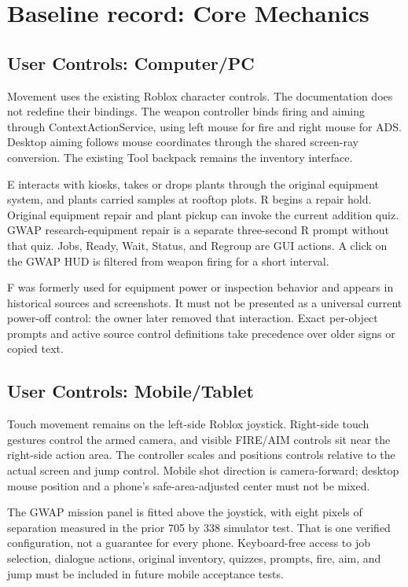 \chapter{Baseline record: Core Mechanics}
\section{User Controls: Computer/\allowbreak{}PC}
Movement uses the existing Roblox character controls.\allowbreak{} The documentation does not redefine their bindings.\allowbreak{} The weapon controller binds firing and aiming through ContextActionService, using left mouse for fire and right mouse for ADS.\allowbreak{} Desktop aiming follows mouse coordinates through the shared screen-ray conversion.\allowbreak{} The existing Tool backpack remains the inventory interface.\allowbreak{}

E interacts with kiosks, takes or drops plants through the original equipment system, and plants carried samples at rooftop plots.\allowbreak{} R begins a repair hold.\allowbreak{} Original equipment repair and plant pickup can invoke the current addition quiz.\allowbreak{} GWAP research-equipment repair is a separate three-second R prompt without that quiz.\allowbreak{} Jobs, Ready, Wait, Status, and Regroup are GUI actions.\allowbreak{} A click on the GWAP HUD is filtered from weapon firing for a short interval.\allowbreak{}

F was formerly used for equipment power or inspection behavior and appears in historical sources and screenshots.\allowbreak{} It must not be presented as a universal current power-off control: the owner later removed that interaction.\allowbreak{} Exact per-object prompts and active source control definitions take precedence over older signs or copied text.\allowbreak{}

\section{User Controls: Mobile/\allowbreak{}Tablet}
Touch movement remains on the left-side Roblox joystick.\allowbreak{} Right-side touch gestures control the armed camera, and visible FIRE/\allowbreak{}AIM controls sit near the right-side action area.\allowbreak{} The controller scales and positions controls relative to the actual screen and jump control.\allowbreak{} Mobile shot direction is camera-forward; desktop mouse position and a phone's safe-area-adjusted center must not be mixed.\allowbreak{}

The GWAP mission panel is fitted above the joystick, with eight pixels of separation measured in the prior 705 by 338 simulator test.\allowbreak{} That is one verified configuration, not a guarantee for every phone.\allowbreak{} Keyboard-free access to job selection, dialogue actions, original inventory, quizzes, prompts, fire, aim, and jump must be included in future mobile acceptance tests.\allowbreak{}

